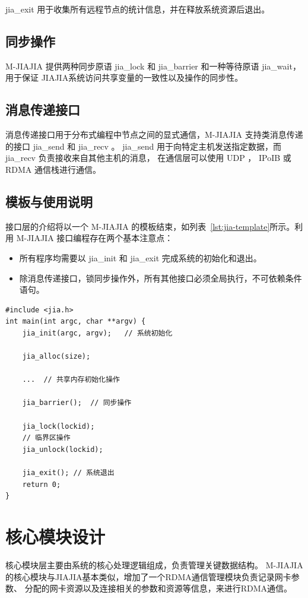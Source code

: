{    jia\_exit 用于收集所有远程节点的统计信息，并在释放系统资源后退出。
    \subsection{同步操作}
    M-JIAJIA 提供两种同步原语 jia\_lock 和 jia\_barrier 和一种等待原语 jia\_wait，
    用于保证 JIAJIA系统访问共享变量的一致性以及操作的同步性。

    \subsection{消息传递接口}
    消息传递接口用于分布式编程中节点之间的显式通信，M-JIAJIA 支持类消息传递的接口 jia\_send 和 jia\_recv 。
    jia\_send 用于向特定主机发送指定数据，而 jia\_recv 负责接收来自其他主机的消息，
    在通信层可以使用 UDP ， IPoIB 或 RDMA 通信栈进行通信。

    \newpage
    \subsection{模板与使用说明}
    接口层的介绍将以一个 M-JIAJIA 的模板结束，如列表~\ref{lst:jia-template}所示。利用 M-JIAJIA 接口编程存在两个基本注意点：
    \begin{itemize}
        \item 所有程序均需要以 jia\_init 和 jia\_exit 完成系统的初始化和退出。
        \item 除消息传递接口，锁同步操作外，所有其他接口必须全局执行，不可依赖条件语句。
    \end{itemize}
    \begin{lstlisting}[style=CStyle, caption={M-JIAJIA 应用模板}, label={lst:jia-template}]
#include <jia.h>
int main(int argc, char **argv) {
    jia_init(argc, argv);   // 系统初始化

    jia_alloc(size);
    
    ...  // 共享内存初始化操作

    jia_barrier();  // 同步操作    

    jia_lock(lockid);
    // 临界区操作
    jia_unlock(lockid);
    
    jia_exit(); // 系统退出
    return 0;
}
    \end{lstlisting}

    \section{核心模块设计}
    核心模块层主要由系统的核心处理逻辑组成，负责管理关键数据结构。
    M-JIAJIA的核心模块与JIAJIA基本类似，增加了一个RDMA通信管理模块负责记录网卡参数、
    分配的网卡资源以及连接相关的参数和资源等信息，来进行RDMA通信。

}

